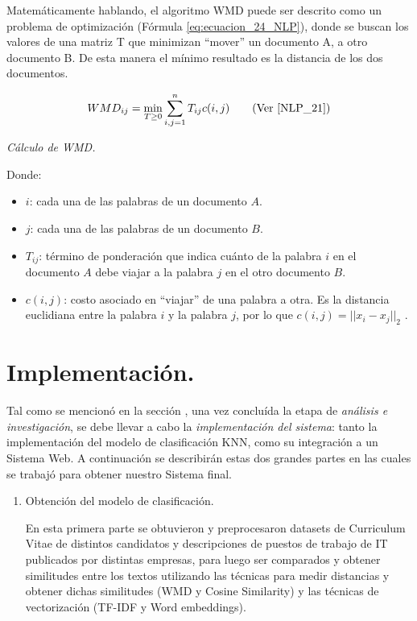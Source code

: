 \documentclass[12pt,a4paper]{article}
\begin{document}
\begin{sloppypar}
Matemáticamente hablando, el algoritmo WMD puede ser descrito como un problema de optimización (Fórmula \ref{eq:ecuacion_24_NLP}), donde se buscan los valores de una matriz T que minimizan “mover” un documento A, a otro documento B. De esta manera el mínimo resultado es la distancia de los dos documentos. 

\begin{equation}\label{eq:ecuacion_24_NLP}
WMD_{ij} = \min_{T\geq0} \sum_{i,j = 1}^{n} T_{ij} c(i,j)      \qquad \text{(Ver \cite{NLP_21})}
\end{equation}
\begin{center}
\textit{Cálculo de WMD.}
\end{center}

Donde:
\begin{itemize}
\item $i$: cada una de las palabras de un documento $A$.
\item $j$: cada una de las palabras de un documento $B$.
\item $T_{ij}$: término de ponderación que indica cuánto de la palabra $i$ en el documento $A$ debe viajar a la palabra $j$ en el otro documento $B$.
\item $c(i,j)$: costo asociado en “viajar” de una palabra a otra. Es la distancia euclidiana entre la palabra $i$ y la palabra $j$, por lo que $c(i,j) = ||x_{i} - x_{j}||_{2}$ \cite{wmd_paper}.

\end{itemize}

\cleardoublepage

\section{Implementación.}\label{5.Implementacion}

Tal como se mencionó en la sección \textit{}, una vez concluída la etapa de \textit{análisis e investigación}, se debe llevar a cabo la \textit{implementación del sistema}: tanto la implementación del modelo de clasificación KNN, como su integración a un Sistema Web. A continuación se describirán estas dos grandes partes en las cuales se trabajó para obtener nuestro Sistema final. 

\begin{enumerate}
\item Obtención del modelo de clasificación. 

En esta primera parte se obtuvieron y preprocesaron datasets de Curriculum Vitae de distintos candidatos y descripciones de puestos de trabajo de IT publicados por distintas empresas, para luego ser comparados y obtener similitudes entre los textos utilizando las técnicas para medir distancias y obtener dichas similitudes (WMD y Cosine Similarity) y las técnicas de vectorización (TF-IDF y Word embeddings).


\end{enumerate}
\end{sloppypar}
\end{document}
